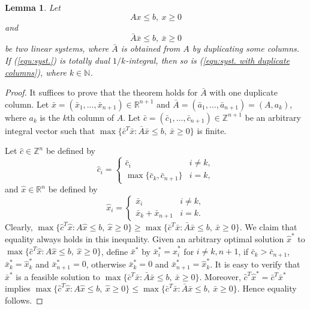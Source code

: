 \documentclass[11pt]{article}
\newtheorem{lemma}[theorem]{Lemma}
\numberwithin{theorem}{section}
\begin{document}
\begin{lemma}
\label{lem:reduct2}
Let 
\begin{equation}\label{equ:syst.}
Ax\leq b,~x\geq 0
\end{equation}
and
\begin{equation}\label{equ:syst. with duplicate columns}
\bar{A}\bar{x}\leq b,~\bar{x}\geq 0
\end{equation}
be two linear systems, where $\bar{A}$ is obtained from $A$ by duplicating some columns. If (\ref{equ:syst.}) is totally dual $1/k$-integral, then so is (\ref{equ:syst. with duplicate columns}), where $k\in \mathbb{N}$.
\end{lemma}
\begin{proof}
It suffices to prove that the theorem holds for $\bar{A}$ with one duplicate column.
Let $\bar{x}=(\bar{x}_1,\ldots,\bar{x}_{n+1})\in\mathbb{R}^{n+1}$ and $\bar{A}=(\bar{a}_1,\ldots,\bar{a}_{n+1})=(A,a_{k})$, where $a_k$ is the $k$th column of $A$. Let $\bar{c}=(\bar{c}_1,\ldots,\bar{c}_{n+1})\in \mathbb{Z}^{n+1}$ be an arbitrary integral vector such that $\max\{\bar{c}^T \bar{x}: \bar{A}\bar{x}\leq b,~\bar{x}\geq 0\}$ is finite. 

Let $\hat{c}\in \mathbb{Z}^n$ be defined by
\begin{equation*}
\hat{c}_i=
\begin{cases}
\bar{c}_i & i\not=k,\\
\max\{\bar{c}_k, \bar{c}_{n+1}\} & i=k,
\end{cases}
\end{equation*}
and $\hat{x}\in \mathbb{R}^n$ be defined by
\begin{equation*}
\hat{x}_i=
\begin{cases}
\bar{x}_i & i\not=k,\\
\bar{x}_k+\bar{x}_{n+1} & i=k.
\end{cases}
\end{equation*}
Clearly,  $\max\{\hat{c}^T \hat{x}:A\hat{x}\leq b,~\hat{x}\geq 0\}\geq\max\{\bar{c}^T \bar{x}:\bar{A}\bar{x}\leq b,~\bar{x}\geq 0\}$. We claim that equality always holds in this inequality. Given an arbitrary optimal solution $\hat{x}^*$ to $\max\{\hat{c}^T \hat{x}:A\hat{x}\leq b,~\hat{x}\geq 0\}$, define $\bar{x}^*$ by $\bar{x}^*_i=\hat{x}^*_i$ for $i\not=k,n+1$, if $\bar{c}_k>\bar{c}_{n+1}$, $\bar{x}^*_k=\hat{x}^*_k$ and $\bar{x}^*_{n+1}=0$, otherwise $\bar{x}^*_k=0$ and $\bar{x}^*_{n+1}=\hat{x}^*_k$. It is easy to verify that $\bar{x}^*$ is a feasible solution to $\max\{\bar{c}^T \bar{x}:\bar{A}\bar{x}\leq b,~\bar{x}\geq 0\}$. Moreover, $\hat{c}^T\hat{x}^*=\bar{c}^T\bar{x}^*$ implies $\max\{\hat{c}^T \hat{x}:A\hat{x}\leq b,~\hat{x}\geq 0\}\leq\max\{\bar{c}^T \bar{x}:\bar{A}\bar{x}\leq b,~\bar{x}\geq 0\}$. Hence equality follows.


\end{proof}
\end{document}
